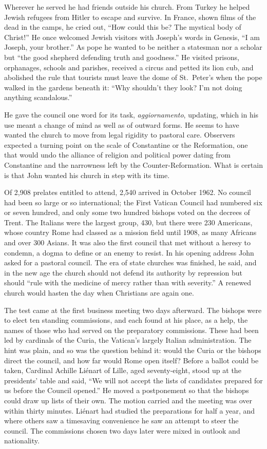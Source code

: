 Wherever he served he had friends outside his church. From Turkey he helped Jewish refugees from
Hitler to escape and survive. In France, shown films of the dead in the camps, he cried out, ``How
could this be? The mystical body of Christ!'' He once welcomed Jewish visitors with Joseph's words in
Genesis, ``I am Joseph, your brother.'' As pope he wanted to be neither a statesman nor a scholar but
``the good shepherd defending truth and goodness.'' He visited prisons, orphanages, schools and
parishes, received a circus and petted its lion cub, and abolished the rule that tourists must leave
the dome of St.~Peter's when the pope walked in the gardens beneath it: ``Why shouldn't they look?
I'm not doing anything scandalous.''

He gave the council one word for its task, \emph{aggiornamento}, updating, which in his use meant a
change of mind as well as of outward forms. He seems to have wanted the church to move from legal
rigidity to pastoral care. Observers expected a turning point on the scale of Constantine or the
Reformation, one that would undo the alliance of religion and political power dating from
Constantine and the narrowness left by the Counter-Reformation. What is certain is that John wanted
his church in step with its time.

Of 2,908 prelates entitled to attend, 2,540 arrived in October 1962. No council had been so large or
so international; the First Vatican Council had numbered six or seven hundred, and only some two
hundred bishops voted on the decrees of Trent. The Italians were the largest group, 430, but there
were 230 Americans, whose country Rome had classed as a mission field until 1908, as many Africans
and over 300 Asians. It was also the first council that met without a heresy to condemn, a dogma to
define or an enemy to resist. In his opening address John asked for a pastoral council. The era of
state churches was finished, he said, and in the new age the church should not defend its authority
by repression but should ``rule with the medicine of mercy rather than with severity.'' A renewed
church would hasten the day when Christians are again one.

The test came at the first business meeting two days afterward. The bishops were to elect ten
standing commissions, and each found at his place, as a help, the names of those who had served on
the preparatory commissions. These had been led by cardinals of the Curia, the Vatican's largely
Italian administration. The hint was plain, and so was the question behind it: would the Curia or
the bishops direct the council, and how far would Rome open itself? Before a ballot could be taken,
Cardinal Achille Li\'enart of Lille, aged seventy-eight, stood up at the presidents' table and said,
``We will not accept the lists of candidates prepared for us before the Council opened.'' He moved a
postponement so that the bishops could draw up lists of their own. The motion carried and the meeting
was over within thirty minutes. Li\'enart had studied the preparations for half a year, and where
others saw a timesaving convenience he saw an attempt to steer the council. The commissions chosen
two days later were mixed in outlook and nationality.

